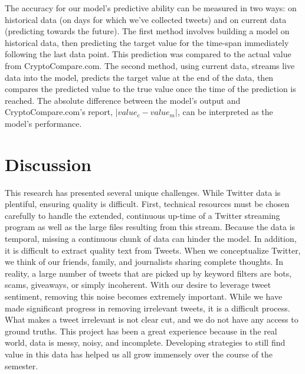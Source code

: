\documentclass[sigconf]{acmart}
\begin{document}
The accuracy for our model's predictive ability can be measured in two ways: on historical data (on days for which we've collected tweets) and on current data (predicting towards the future). The first method involves building a model on historical data, then predicting the target value for the time-span immediately following the last data point. This prediction was compared to the actual value from CryptoCompare.com. The second method, using current data, streams live data into the model, predicts the target value at the end of the data, then compares the predicted value to the true value once the time of the prediction is reached. The absolute difference between the model's output and CryptoCompare.com's report, $|value_c - value_m|$, can be interpreted as the model's performance.

\section{Discussion}

This research has presented several unique challenges. While Twitter data is plentiful, ensuring quality is difficult. First, technical resources must be chosen carefully to handle the extended, continuous up-time of a Twitter streaming program as well as the large files resulting from this stream. Because the data is temporal, missing a continuous chunk of data can hinder the model. In addition, it is difficult to extract quality text from Tweets. When we conceptualize Twitter, we think of our friends, family, and journalists sharing complete thoughts. In reality, a large number of tweets that are picked up by keyword filters are bots, scams, giveaways, or simply incoherent. With our desire to leverage tweet sentiment, removing this noise becomes extremely important. While we have made significant progress in removing irrelevant tweets, it is a difficult process. What makes a tweet irrelevant is not clear cut, and we do not have any access to ground truths. This project has been a great experience because in the real world, data is messy, noisy, and incomplete. Developing strategies to still find value in this data has helped us all grow immensely over the course of the semester.



\end{document}
